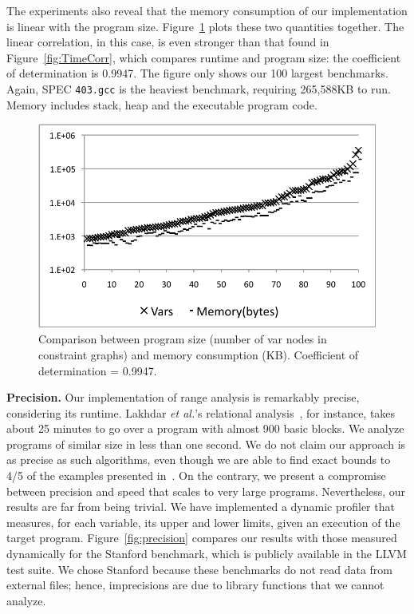\documentclass[preprint]{sigplanconf}[10pt]
\begin{document}
The experiments also reveal that the memory consumption of our implementation
is linear with the program size.
Figure~\ref{fig:MemCorr} plots these two quantities together.
The linear correlation, in this case, is even stronger than that found in
Figure~\ref{fig:TimeCorr}, which compares runtime and program size: the
coefficient of determination is 0.9947.
The figure only shows our 100 largest benchmarks.
Again, SPEC \texttt{403.gcc} is the heaviest benchmark, requiring
265,588KB to run.
Memory includes stack, heap and the executable program code.

\begin{figure}[t!]
\begin{center}
\includegraphics[width=\columnwidth]{images/MemCorr}
\end{center}
\caption{\label{fig:MemCorr}
Comparison between program size (number of var nodes in constraint
graphs) and memory consumption (KB).
Coefficient of determination = 0.9947.
}
\end{figure}

\noindent
\textbf{Precision.}
Our implementation of range analysis is remarkably precise, considering its
runtime.
Lakhdar {\em et al.}'s relational analysis~\cite{Lakhdar11}, for instance, takes
about 25 minutes to go over a program with almost 900 basic blocks.
We analyze programs of similar size in less than one second.
We do not claim our approach is as precise as such algorithms, even though we
are able to find exact bounds to 4/5 of the examples presented
in~\cite{Lakhdar11}.
On the contrary, we present a compromise between precision and speed
that scales to very large programs.
Nevertheless, our results are far from being trivial.
We have implemented a dynamic profiler that measures, for each variable,
its upper and lower limits, given an execution of the target program.
Figure~\ref{fig:precision} compares our results with those measured
dynamically for the Stanford benchmark, which is publicly
available in the LLVM test suite.
We chose Stanford because these benchmarks do not read data from external
files; hence, imprecisions are due to library functions that we cannot
analyze.
\end{document}
